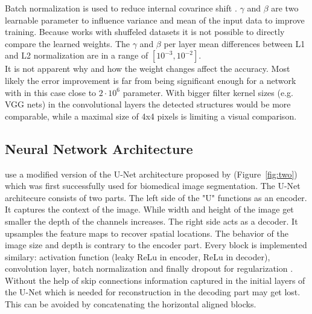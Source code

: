 \documentclass[acmtog]{techreportacmart}
\begin{document}
Batch normalization is used to reduce internal covarince shift \cite{ioffe2015}. 
$\gamma$ and $\beta$ are two learnable parameter to influence variance and mean of the input data to improve training. Because \cite{Thuerey20} works with shuffeled datasets it is not possible to directly compare the learned weights. The $\gamma$ and $\beta$ per layer mean differences between L1 and L2 normalization are in a range of $[10^{-3}, 10^{-2}]$. \\ 
It is not apparent why and how the weight changes affect the accuracy. Most likely the error improvement is far from being significant enough for a network with in this case close to $2 \cdot 10^{6}$ parameter. With bigger filter kernel sizes (e.g. VGG nets) in the convolutional layers the detected structures would be more comparable, while a maximal size of 4x4 pixels is limiting a visual comparison.

\subsection{Neural Network Architecture}
\cite{Thuerey20} use a modified version of the U-Net architecture proposed by \cite{ronneberger2015} (Figure~\ref{fig:two}) which was first successfully used for biomedical image segmentation.
The U-Net architecure consists of two parts. The left side of the "U" functions as an encoder. It captures the context of the image. While width and height of the image get smaller the depth of the channels increases. The right side acts as a decoder. It upsamples the feature maps to recover spatial locations. The behavior of the image size and depth is contrary to the encoder part. Every block is implemented similary: activation function (leaky ReLu in encoder, ReLu in decoder), convolution layer, batch normalization and finally dropout for regularization \cite{Thuerey20}. Without the help of skip connections information captured in the initial layers of the U-Net which is needed for reconstruction in the decoding part may get lost. This can be avoided by concatenating the horizontal aligned blocks.
\end{document}
